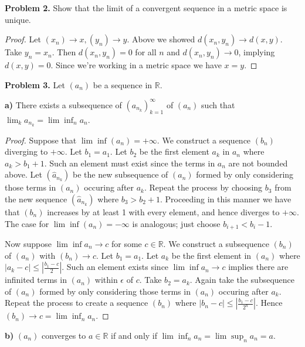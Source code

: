 \documentclass[12pt]{article}
\begin{document}

\textbf{Problem 2.}
Show that the limit of a convergent sequence in a metric space is unique.
\begin{proof}
Let $(x_n) \rightarrow x, (y_n) \rightarrow y$. Above we showed $d(x_n,
y_n) \rightarrow d(x, y)$. Take $y_n = x_n$. Then $d(x_n, y_n) = 0$ for all
$n$ and $d(x_n, y_n) \rightarrow 0$, implying $d(x, y) = 0$. Since we're
working in a metric space we have $x = y$.
\end{proof}


\textbf{Problem 3.}
Let $(a_n)$ be a sequence in $\mathbb{R}$.

\textbf{a)}
There exists a subsequence of $(a_{n_k})_{k=1}^{\infty}$ of $(a_n)$
such that $\lim_k a_{n_k} = \lim \inf_n a_n$.
\begin{proof}
Suppose that $\lim \inf (a_n) = +\infty$. We construct a sequence $(b_n)$
diverging to $+ \infty$. Let $b_1 = a_1$. Let $b_2$ be the first element
$a_k$ in $a_n$ where $a_k > b_1 + 1$. Such an element must exist since the
terms in $a_n$ are not bounded above. Let $(\hat{a}_{n_k})$ be the new
subsequence of $(a_n)$ formed by only considering those terms in $(a_n)$
occuring after $a_k$. Repeat the process by choosing $b_3$ from the new
sequence $(\hat{a}_{n_k})$ where $b_3 > b_2 + 1$. Proceeding in this manner
we have that $(b_n)$ increases by at least 1 with every element, and hence
diverges to $+ \infty$. The case for $\lim \inf (a_n) = -\infty$ is
analogous; just choose $b_{i + 1} < b_{i} - 1$. 

Now suppose $\lim \inf a_n \rightarrow c$ for some $c \in \mathbb{R}$. We
construct a subsequence $(b_n)$ of $(a_n)$ with $(b_n) \rightarrow c$. Let
$b_1 = a_1$. Let $a_k$ be the first element in $(a_n)$ where $|a_k - c|
\leq |\frac{b_1 - c}{2}|$. Such an element exists since $\lim \inf a_n
\rightarrow c$ implies there are infinited terms in $(a_n)$ within
$\epsilon$
of $c$. Take $b_2 = a_k$. Again take the
subsequence of $(a_n)$ formed by only considering those terms in $(a_n)$
occuring after $a_k$. Repeat the process to create a sequence $(b_n)$ 
where $| b_n - c| \leq | \frac{b_1 - c}{2^n}|$. Hence $(b_n) \rightarrow c= \lim \inf_n a_n$.

\end{proof}

\textbf{b)}
$(a_n)$ converges to $a \in \mathbb{R}$ if and only if $\lim \inf_n a_n =
\lim \sup_n a_n = a$.
\end{document}

